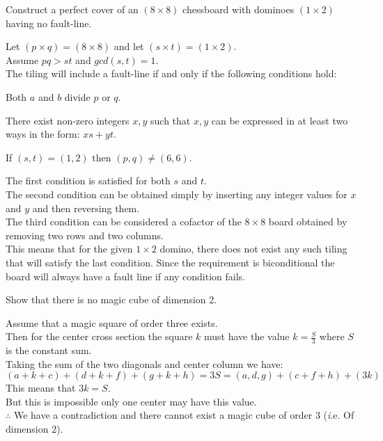 \begin{prob}
Construct a perfect cover of an $(8 \times 8)$ chessboard with dominoes $(1 \times 2)$ having no fault-line.

Let $(p \times q) = (8 \times 8)$ and let $(s \times t) = (1 \times 2)$.\\
Assume $pq > st$ and $gcd(s,t)=1$. \\ 
The tiling will include a fault-line if and only if the following conditions hold: 
\end{prob}


\begin{case}
Both $a$ and $b$ divide $p$ or $q$. 
\end{case}
 

\begin{case}
There exist non-zero integers $x,y$ such that $x,y$ can be expressed in at least two ways in the form: $xs+yt$. 
\end{case}
    
    
\begin{case}
If $(s,t) = (1,2)$ then $(p,q) \neq (6,6)$.
\end{case}


\begin{sol}
The first condition is satisfied for both $s$ and $t$.\\
The second condition can be obtained simply by inserting any integer values for $x$ and $y$ and then reversing them. \\
The third condition can be considered a cofactor of the $8 \times 8$ board obtained by removing two rows and two columns. \\
This means that for the given $1 \times 2$ domino, there does not exist any such tiling that will satisfy the last condition. Since the requirement is biconditional the board will always have a fault line if any condition fails.
\end{sol}

\begin{prob}
Show that there is no magic cube of dimension 2.
\end{prob}

\begin{sol}
Assume that a magic square of order three exists. \\

Then for the center cross section the square $k$ must have the value $k = \frac{S}{3}$ where $S$ is the constant sum. \\

Taking the sum of the two diagonals and center column we have: $$(a+k+c)+(d+k+f)+(g+k+h) = 3S = (a,d,g)+(c+f+h)+(3k) $$
This means that $3k = S$. \\

But this is impossible only one center may have this value. \\

$\therefore$ We have a contradiction and there cannot exist a magic cube of order 3 (\textit i.e. Of dimension 2).

\end{sol}